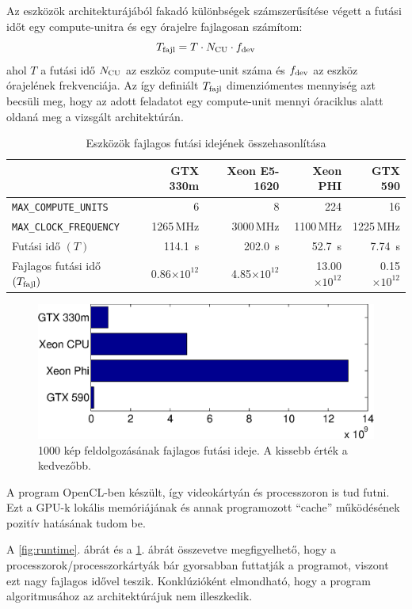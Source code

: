 	Az eszközök architekturájából fakadó különbségek számszerűsítése végett a futási időt egy compute-unitra és egy
	órajelre fajlagosan számítom:
	\begin{equation}
	T_{\rm fajl} = T \cdot N_{\rm CU} \cdot f_{\rm dev}
	\end{equation}
	ahol $T$ a futási idő $N_{\rm CU}$ az eszköz compute-unit
        száma és $f_{\rm dev}$ az eszköz órajelének frekvenciája. Az
        így definiált $T_{\rm fajl}$ dimenziómentes mennyiség azt
        becsüli meg, hogy az adott feladatot egy compute-unit mennyi
        óraciklus alatt oldaná meg a vizsgált architektúrán.
        
	\begin{table}[H]
	\footnotesize
	\centering
	
	\setlength{\extrarowheight}{3pt}
	\begin{tabular}{ l | r | r | r | r}
		 & GTX 330m & Xeon E5-1620 & Xeon PHI & GTX 590\\ \hline
		\texttt{MAX\_COMPUTE\_UNITS} & 6 & 8 & 224 & 16\\
		\texttt{MAX\_CLOCK\_FREQUENCY} & 1265\,MHz & 3000\,MHz & 1100\,MHz & 1225\,MHz\\\hline\hline
		Futási idő $(T)$ & 114.1~s & 202.0~s & 52.7~s & 7.74~s\\
		Fajlagos futási idő $(T_{\rm fajl})$ & 0.86$\times 10^{12}$ & 4.85$\times 10^{12}$ & 13.00$\times 10^{12}$ & 0.15$\times 10^{12}$
	\end{tabular}
	
	\caption{Eszközök fajlagos futási idejének összehasonlítása}
	\label{table:results_f}
	\end{table}	
	
	\begin{figure}[!h]
	\begin{center}
	  \includegraphics[width=0.9\columnwidth]{figures/eps/runtime_f.eps}
	  \caption[1000 kép feldolgozásának fajlagos futási ideje.]{1000 kép feldolgozásának fajlagos futási ideje. A kissebb érték a
	  kedvezőbb.}
	  \label{fig:runtime_f}
	\end{center}
	\end{figure}
	
	A program OpenCL-ben készült, így videokártyán és processzoron is tud futni.
	Ezt a GPU-k lokális memóriájának és annak programozott ``cache'' működésének pozitív hatásának tudom be.
	
	A \ref{fig:runtime}. ábrát és a \ref{fig:runtime_f}. ábrát összevetve megfigyelhető, hogy a processzorok/processzorkártyák bár
	gyorsabban futtatják a programot, viszont ezt nagy fajlagos idővel teszik. Konklúzióként elmondható, hogy a program
	algoritmusához az architektúrájuk nem illeszkedik.
	
